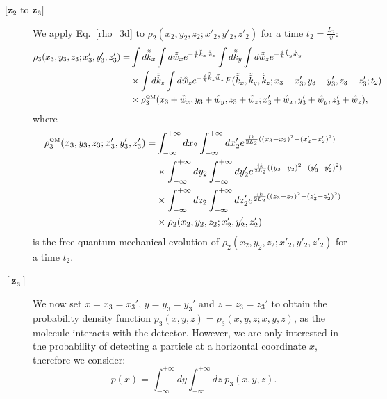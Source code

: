 \documentclass[12pt,groupedaddress,pra,aps]{revtex4-1}
\begin{document}
\begin{description}
\item[$\boldsymbol{[z_2}$ to $\boldsymbol{z_3]}$] 
We apply Eq.~\eqref{rho_3d} to $\rho_2(x_2, y_2, z_2;x'_2, y'_2, z'_2)$ for a time $t_2=\frac{L_2}{v}$:
\begin{equation}\label{rho_3d_d}
\begin{split}
\rho_3(x_3, y_3, z_3;x'_3, y'_3, z'_3) = & \int d\tilde{\tilde{k}}_x \int d\tilde{\tilde{w}}_x  e^{-\frac{i}{\hbar}\tilde{\tilde{k}}_x \tilde{\tilde{w}}_x}  
\int d\tilde{\tilde{k}}_y \int d\tilde{\tilde{w}}_z  e^{-\frac{i}{\hbar}\tilde{\tilde{k}}_y \tilde{\tilde{w}}_y} \\
&\times\int d\tilde{\tilde{k}}_z \int d\tilde{\tilde{w}}_z  e^{-\frac{i}{\hbar}\tilde{\tilde{k}}_z \tilde{\tilde{w}}_z} 
F(\tilde{\tilde{k}}_x,\tilde{\tilde{k}}_y,\tilde{\tilde{k}}_z;x_3-x_3',y_3-y_3',z_3-z_3';t_2) \\
& \times \rho_3^{\text{\tiny QM}} (x_3 + \tilde{\tilde{w}}_x, y_3+ \tilde{\tilde{w}}_y, z_3+ \tilde{\tilde{w}}_z;x'_3+ \tilde{\tilde{w}}_x, y'_3+ \tilde{\tilde{w}}_y, z'_3+ \tilde{\tilde{w}}_z), 
\end{split}
\end{equation}
where
\begin{equation}\label{rho_3d_d_qm}
\begin{split}
\rho_3^{\text{\tiny QM}} (x_3, y_3, z_3;x'_3, y'_3, z'_3) =  & \int_{-\infty}^{+\infty} dx_2 \int_{-\infty}^{+\infty} dx_2' e^{\frac{ik}{2L_2}((x_3-x_2)^2-(x_3'-x'_2)^2)}  \\
&\times \int_{-\infty}^{+\infty} dy_2 \int_{-\infty}^{+\infty} dy_2' e^{\frac{ik}{2L_2}((y_3-y_2)^2-(y_3'-y'_2)^2)} \\
&\times \int_{-\infty}^{+\infty} dz_2 \int_{-\infty}^{+\infty} dz_2' e^{\frac{ik}{2L_2}((z_3-z_2)^2-(z_3'-z'_2)^2)} \\
&\times\rho_2(x_2, y_2, z_2;x'_2, y'_2, z'_2)
\end{split}
\end{equation}
is the free quantum mechanical evolution of $\rho_2(x_2, y_2, z_2;x'_2, y'_2, z'_2)$ for a time $t_2$.

\item[$\boldsymbol{[z_3]}$] 
We now set $x=x_3=x_3'$, $y=y_3=y_3'$ and $z=z_3=z_3'$ to obtain the probability density function
$p_3(x, y, z)= \rho_3(x, y, z;x, y, z)$, as the molecule interacts with the detector. However, we are only interested in the probability of detecting a particle at a horizontal coordinate $x$, therefore we consider: 
\begin{equation}\label{p3_3d}
p(x) = \int_{-\infty}^{+\infty} dy \int_{-\infty}^{+\infty} dz \;p_3(x, y, z).
\end{equation}


\end{description}
\end{document}
